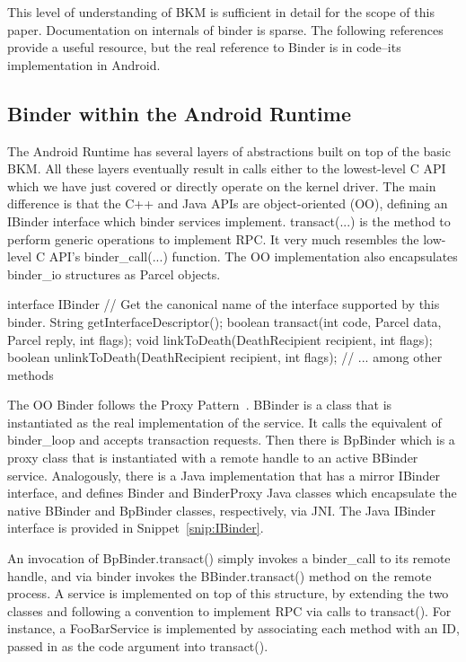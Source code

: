 \documentclass[prodmode]{acmlarge}
\begin{document}
This level of understanding of BKM is sufficient in detail for the scope of this paper. Documentation on internals of binder is sparse. The following references~\cite{BinderLinuxFoundation,BinderMastersThesis} provide a useful resource, but the real reference to Binder is in code--its implementation in Android.

\subsection{Binder within the Android Runtime}
The Android Runtime has several layers of abstractions built on top of the basic BKM. All these layers eventually result in calls either to the lowest-level C API which we have just covered or directly operate on the kernel driver. The main difference is that the C++ and Java APIs are object-oriented (OO), defining an IBinder interface which binder services implement. transact(...) is the method to perform generic operations to implement RPC. It very much resembles the low-level C API's binder\_call(...) function. The OO implementation also encapsulates binder\_io structures as Parcel objects.

\begin{snippet}[label=snip:IBinder]
interface IBinder {
  // Get the canonical name of the interface supported by this binder.
  String getInterfaceDescriptor();
  boolean transact(int code, Parcel data, Parcel reply, int flags);
  void linkToDeath(DeathRecipient recipient, int flags);
  boolean unlinkToDeath(DeathRecipient recipient, int flags);
  // ... among other methods
}
\end{snippet}

The OO Binder follows the Proxy Pattern~\cite{ProxyPattern}. BBinder is a class that is instantiated as the real implementation of the service. It calls the equivalent of binder\_loop and accepts transaction requests. Then there is BpBinder which is a proxy class that is instantiated with a remote handle to an active BBinder service. Analogously, there is a Java implementation that has a mirror IBinder interface, and defines Binder and BinderProxy Java classes which encapsulate the native BBinder and BpBinder classes, respectively, via JNI. The Java IBinder interface is provided in Snippet~\ref{snip:IBinder}.


An invocation of BpBinder.transact() simply invokes a binder\_call to its remote handle, and via binder invokes the BBinder.transact() method on the remote process. A service is implemented on top of this structure, by extending the two classes and following a convention to implement RPC via calls to transact(). For instance, a FooBarService is implemented by associating each method with an ID, passed in as the code argument into transact().
\end{document}
